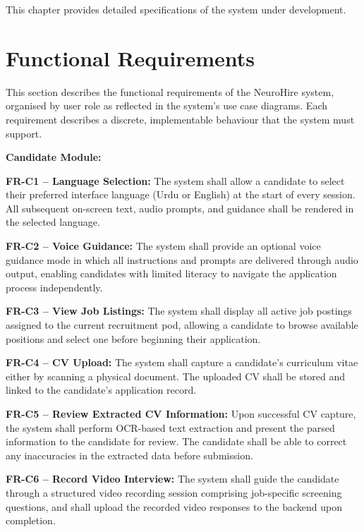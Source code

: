 This chapter provides detailed specifications of the system under development.

\section{Functional Requirements}

This section describes the functional requirements of the NeuroHire system, organised by
user role as reflected in the system's use case diagrams. Each requirement describes a
discrete, implementable behaviour that the system must support.

\begin{outline}

  \1 \textbf{Candidate Module:}

  \2 \textbf{FR-C1 -- Language Selection:}
  The system shall allow a candidate to select their preferred interface language (Urdu or
  English) at the start of every session. All subsequent on-screen text, audio prompts, and
  guidance shall be rendered in the selected language.

  \2 \textbf{FR-C2 -- Voice Guidance:}
  The system shall provide an optional voice guidance mode in which all instructions and
  prompts are delivered through audio output, enabling candidates with limited literacy to
  navigate the application process independently.

  \2 \textbf{FR-C3 -- View Job Listings:}
  The system shall display all active job postings assigned to the current recruitment pod,
  allowing a candidate to browse available positions and select one before beginning their
  application.

  \2 \textbf{FR-C4 -- CV Upload:}
  The system shall capture a candidate's curriculum vitae either by scanning a physical
  document. The uploaded CV shall be stored and linked to
  the candidate's application record.

  \2 \textbf{FR-C5 -- Review Extracted CV Information:}
  Upon successful CV capture, the system shall perform OCR-based text extraction and present
  the parsed information to the candidate for review. The candidate shall be able to correct
  any inaccuracies in the extracted data before submission.

  \2 \textbf{FR-C6 -- Record Video Interview:}
  The system shall guide the candidate through a structured video recording session
  comprising job-specific screening questions, and shall upload the recorded video responses
  to the backend upon completion.


\end{outline}

